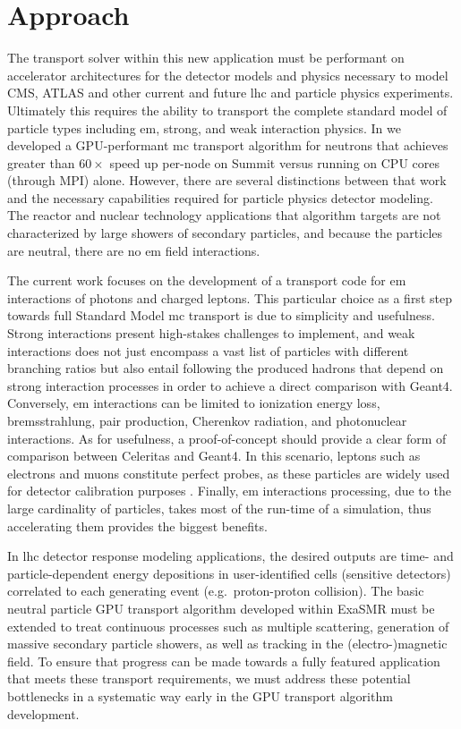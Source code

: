 \documentclass[10pt]{article}
\begin{document}
\section*{Approach}

The transport solver within this new application must be performant on
accelerator architectures for the detector models and physics necessary to model
CMS, ATLAS and other current and future \ac{lhc} and particle physics
experiments. Ultimately this requires the ability to transport the complete
standard model of particle types including \ac{em}, strong, and weak
interaction physics. In \textcite{hamilton_continuous-energy_2019} we developed
a GPU-performant \ac{mc} transport algorithm for neutrons that achieves greater
than $60\times$ speed up per-node on Summit versus running on CPU cores (through
MPI) alone. However, there are several distinctions between that work and the
necessary capabilities required for particle physics detector modeling. The
reactor and nuclear technology applications that algorithm targets are not
characterized by large showers of secondary particles, and because the particles
are neutral, there are no \ac{em} field interactions.

The current work focuses on the development of a transport code for
\ac{em} interactions of photons and charged leptons. This particular
choice as a first step towards full Standard Model \ac{mc} transport is due to
simplicity and usefulness. Strong interactions present high-stakes challenges to
implement, and weak interactions does not just encompass a vast list of
particles with different branching ratios but also entail following the produced
hadrons that depend on strong interaction processes in order to achieve a direct
comparison with Geant4. Conversely, \ac{em} interactions can be limited
to ionization energy loss, bremsstrahlung, pair production, Cherenkov radiation,
and photonuclear interactions. As for usefulness, a proof-of-concept should
provide a clear form of comparison between Celeritas and Geant4. In this
scenario, leptons such as electrons and muons constitute perfect probes, as
these particles are widely used for detector calibration purposes
\cite{atlas_calibration_e,atlas_calibration_mu}.  Finally, \ac{em}
interactions processing, due to the large cardinality of particles, takes most
of the run-time of a simulation, thus accelerating them provides the biggest
benefits.

In \ac{lhc} detector response modeling applications, the desired outputs are
time- and particle-dependent energy depositions in user-identified cells
(sensitive detectors) correlated to each generating event (e.g.~proton-proton
collision). The basic neutral particle GPU transport algorithm developed within
ExaSMR must be extended to treat continuous processes such as multiple
scattering, generation of massive secondary particle showers, as well as
tracking in the (electro-)magnetic field. To ensure that progress can be made
towards a fully featured application that meets these transport requirements, we
must address these potential bottlenecks in a systematic way early in the GPU
transport algorithm development.
\end{document}

